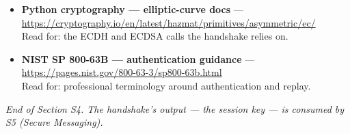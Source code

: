 \documentclass[11pt,a4paper]{article}
\begin{document}
\begin{itemize}
        \url{https://docs.python.org/3/library/json.html}\\
        Read for: \texttt{json.dumps} / \texttt{json.loads} used by
        \texttt{to\_json} / \texttt{from\_json}.
  \item \textbf{Python cryptography --- elliptic-curve docs} ---
        \url{https://cryptography.io/en/latest/hazmat/primitives/asymmetric/ec/}\\
        Read for: the ECDH and ECDSA calls the handshake relies on.
  \item \textbf{NIST SP 800-63B --- authentication guidance} ---
        \url{https://pages.nist.gov/800-63-3/sp800-63b.html}\\
        Read for: professional terminology around authentication and replay.
\end{itemize}

\vfill
\begin{center}\footnotesize\itshape
End of Section S4. The handshake's output --- the session key --- is consumed by
S5 (Secure Messaging).
\end{center}
\end{document}
